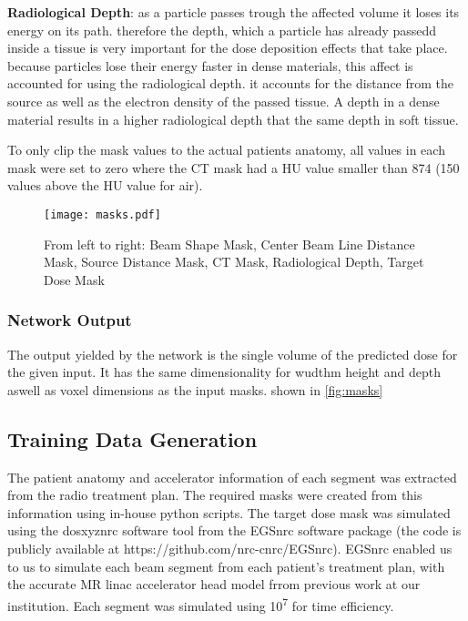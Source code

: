 \begin{hangingpar}
    \item \textbf{Radiological Depth}: as a particle passes trough the affected volume it loses its energy on its path. therefore the depth, which a particle has already passedd inside a tissue is very important for the dose deposition effects that take place. because particles lose their energy faster in dense materials, this affect is accounted for using the radiological depth. it accounts for the distance from the source as well as the electron density of the passed tissue. A depth in a dense material results in a higher radiological depth that the same depth in soft tissue.
\end{hangingpar}

To only clip the mask values to the actual patients anatomy, all values in each mask were set to zero where the CT mask had a HU value smaller than 874 (150 values above the HU value for air).

\begin{figure}
    \centering
    \texttt{[image: masks.pdf]}
    \caption{From left to right: Beam Shape Mask, Center Beam Line Distance Mask, Source Distance Mask, CT Mask, Radiological Depth, Target Dose Mask}
    \label{fig:masks}
\end{figure}

\subsubsection{Network Output}

The output yielded by the network is the single volume of the predicted dose for the given input. It has the same dimensionality for wudthm height and depth aswell as voxel dimensions as the input masks. shown in \autoref{fig:masks}

\subsection{Training Data Generation}

The patient anatomy and accelerator information of each segment was extracted from the radio treatment plan. The required masks were created from this information using in-house python scripts. The target dose mask was simulated using the dosxyznrc software tool from the EGSnrc software package (the code is publicly available at https://github.com/nrc-cnrc/EGSnrc). EGSnrc enabled us to  us to simulate each beam segment from each patient's treatment plan, with the accurate MR linac accelerator head model frrom previous work at our institution. Each segment was simulated using 10\textsuperscript{7} for time efficiency. 


